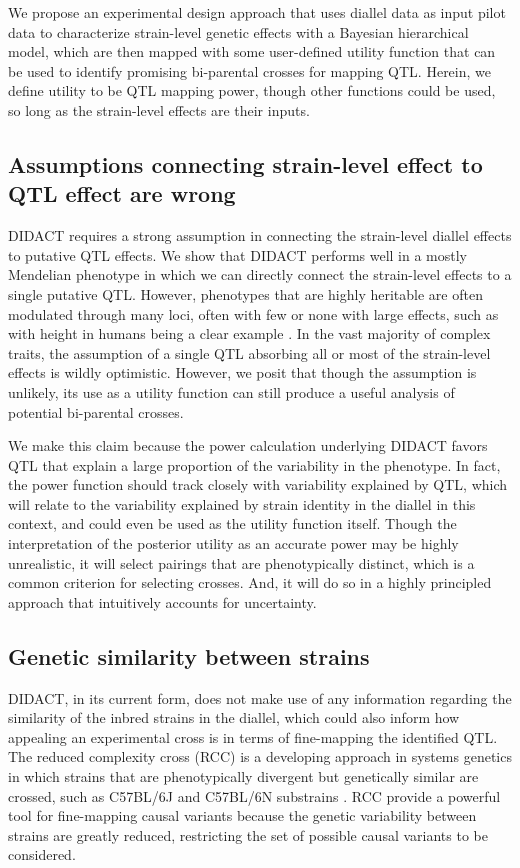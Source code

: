 We propose an experimental design approach that uses diallel data as input pilot data to characterize strain-level genetic effects with a Bayesian hierarchical model, which are then mapped with some user-defined utility function that can be used to identify promising bi-parental crosses for mapping QTL. Herein, we define utility to be QTL mapping power, though other functions could be used, so long as the strain-level effects are their inputs.

\subsection{Assumptions connecting strain-level effect to QTL effect are wrong}

DIDACT requires a strong assumption in connecting the strain-level diallel effects to putative QTL effects. We show that DIDACT performs well in a mostly Mendelian phenotype in which we can directly connect the strain-level effects to a single putative QTL. However, phenotypes that are highly heritable are often modulated through many loci, often with few or none with large effects, such as with height in humans being a clear example \citep{Wood2014}. In the vast majority of complex traits, the assumption of a single QTL absorbing all or most of the strain-level effects is wildly optimistic. However, we posit that though the assumption is unlikely, its use as a utility function can still produce a useful analysis of potential bi-parental crosses.

We make this claim because the power calculation underlying DIDACT favors QTL that explain a large proportion of the variability in the phenotype. In fact, the power function should track closely with variability explained by QTL, which will relate to the variability explained by strain identity in the diallel in this context, and could even be used as the utility function itself. Though the interpretation of the posterior utility as an accurate power may be highly unrealistic, it will select pairings that are phenotypically distinct, which is a common criterion for selecting crosses. And, it will do so in a highly principled approach that intuitively accounts for uncertainty.

\subsection{Genetic similarity between strains}

DIDACT, in its current form, does not make use of any information regarding the similarity of the inbred strains in the diallel, which could also inform how appealing an experimental cross is in terms of fine-mapping the identified QTL. The reduced complexity cross (RCC) is a developing approach in systems genetics \citep{Williams2017} in which strains that are phenotypically divergent but genetically similar are crossed, such as C57BL/6J and C57BL/6N substrains \citep{Khisti2006,Mulligan2008,Kumar2013,Simon2013,Kirkpatrick2014}. RCC provide a powerful tool for fine-mapping causal variants because the genetic variability between strains are greatly reduced, restricting the set of possible causal variants to be considered.

